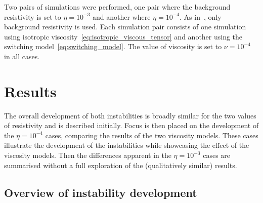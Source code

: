 \documentclass[12pt]{article}
\begin{document}
Two pairs of simulations were performed, one pair where the background resistivity is set to $\eta=10^{-3}$ and another where $\eta=10^{-4}$. As in~\cite{quinnEffectAnisotropicViscosity2020a}, only background resistivity is used. Each simulation pair consists of one simulation using isotropic viscosity~\eqref{eq:isotropic_viscous_tensor} and another using the switching model~\eqref{eq:switching_model}. The value of viscosity is set to $\nu = 10^{-4}$ in all cases.

\section{Results}

The overall development of both instabilities is broadly similar for the two values of resistivity and is described initially. Focus is then placed on the development of the $\eta=10^{-4}$ cases, comparing the results of the two viscosity models. These cases illustrate the development of the instabilities while showcasing the effect of the viscosity models. Then the differences apparent in the $\eta=10^{-3}$ cases are summarised without a full exploration of the (qualitatively similar) results.

\subsection{Overview of instability development}
\end{document}
